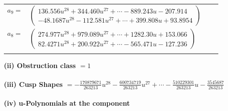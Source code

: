 \documentclass[1p]{elsarticle_modified}
\theoremstyle{definition}
\begin{document}
\begin{tabular}{m{7pt} m{180pt} m{7pt} m{180pt} }
\flushright $a_{9}=$&$\begin{pmatrix}136.556 u^{28}+344.460 u^{27}+\cdots-889.243 u-207.914\\-48.1687 u^{28}-112.581 u^{27}+\cdots+399.808 u+93.8954\end{pmatrix}$ \\
\flushright $a_{8}=$&$\begin{pmatrix}274.977 u^{28}+979.089 u^{27}+\cdots+1282.30 u+153.066\\82.4271 u^{28}+200.922 u^{27}+\cdots-565.471 u-127.236\end{pmatrix}$\\&\end{tabular}
\flushleft \textbf{(ii) Obstruction class $= 1$}\\~\\
\flushleft \textbf{(iii) Cusp Shapes $= -\frac{170879671}{263213} u^{28}-\frac{600734719}{263213} u^{27}+\cdots-\frac{510229301}{263213} u-\frac{3545687}{263213}$}\\~\\
\newpage\renewcommand{\arraystretch}{1}
\flushleft \textbf{(iv) u-Polynomials at the component}\newline \\
\end{document}
